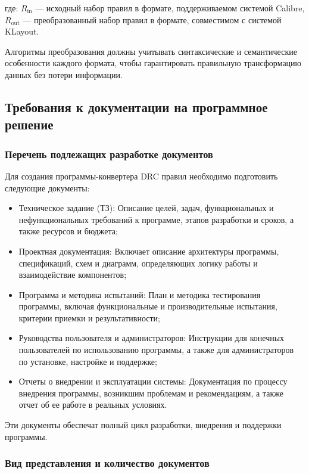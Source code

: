 где:
\( R_{\text{in}} \) --- исходный набор правил в формате,
поддерживаемом системой Calibre,
\( R_{\text{out}} \) --- преобразованный набор правил в формате,
совместимом с системой KLayout.

Алгоритмы преобразования должны учитывать синтаксические
и семантические особенности каждого формата,
чтобы гарантировать правильную трансформацию данных без потери информации.

\subsection{Требования к документации на программное решение}

\subsubsection{Перечень подлежащих разработке документов}

Для создания программы-конвертера DRC
правил необходимо подготовить следующие документы:

\begin{itemize}
	\item Техническое задание (ТЗ):
		Описание целей, задач, функциональных
		и нефункциональных требований к программе,
		этапов разработки и сроков, а также ресурсов и бюджета;
	\item Проектная документация:
		Включает описание архитектуры программы, спецификаций,
		схем и диаграмм, определяющих логику работы
		и взаимодействие компонентов;
	\item Программа и методика испытаний:
		План и методика тестирования программы,
		включая функциональные и производительные испытания,
		критерии приемки и результативности;
	\item Руководства пользователя и администраторов:
		Инструкции для конечных пользователей по использованию программы,
		а также для администраторов по установке, настройке и поддержке;
	\item Отчеты о внедрении и эксплуатации системы:
		Документация по процессу внедрения программы,
		возникшим проблемам и рекомендациям,
		а также отчет об ее работе в реальных условиях.
\end{itemize}

Эти документы обеспечат полный цикл разработки,
внедрения и поддержки программы.

\subsubsection{Вид представления и количество документов}

